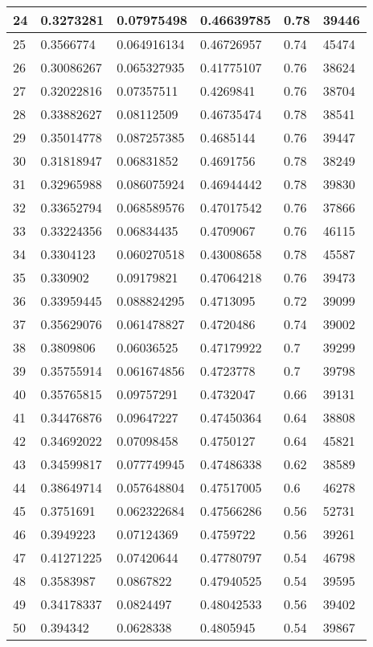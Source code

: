 \begin{longtable}{|l|l|l|l|l|l|}
24 & 0.3273281 & 0.07975498 & 0.46639785 & 0.78 & 39446 \\ \hline 
25 & 0.3566774 & 0.064916134 & 0.46726957 & 0.74 & 45474 \\ \hline 
26 & 0.30086267 & 0.065327935 & 0.41775107 & 0.76 & 38624 \\ \hline 
27 & 0.32022816 & 0.07357511 & 0.4269841 & 0.76 & 38704 \\ \hline 
28 & 0.33882627 & 0.08112509 & 0.46735474 & 0.78 & 38541 \\ \hline 
29 & 0.35014778 & 0.087257385 & 0.4685144 & 0.76 & 39447 \\ \hline 
30 & 0.31818947 & 0.06831852 & 0.4691756 & 0.78 & 38249 \\ \hline 
31 & 0.32965988 & 0.086075924 & 0.46944442 & 0.78 & 39830 \\ \hline 
32 & 0.33652794 & 0.068589576 & 0.47017542 & 0.76 & 37866 \\ \hline 
33 & 0.33224356 & 0.06834435 & 0.4709067 & 0.76 & 46115 \\ \hline 
34 & 0.3304123 & 0.060270518 & 0.43008658 & 0.78 & 45587 \\ \hline 
35 & 0.330902 & 0.09179821 & 0.47064218 & 0.76 & 39473 \\ \hline 
36 & 0.33959445 & 0.088824295 & 0.4713095 & 0.72 & 39099 \\ \hline 
37 & 0.35629076 & 0.061478827 & 0.4720486 & 0.74 & 39002 \\ \hline 
38 & 0.3809806 & 0.06036525 & 0.47179922 & 0.7 & 39299 \\ \hline 
39 & 0.35755914 & 0.061674856 & 0.4723778 & 0.7 & 39798 \\ \hline 
40 & 0.35765815 & 0.09757291 & 0.4732047 & 0.66 & 39131 \\ \hline 
41 & 0.34476876 & 0.09647227 & 0.47450364 & 0.64 & 38808 \\ \hline 
42 & 0.34692022 & 0.07098458 & 0.4750127 & 0.64 & 45821 \\ \hline 
43 & 0.34599817 & 0.077749945 & 0.47486338 & 0.62 & 38589 \\ \hline 
44 & 0.38649714 & 0.057648804 & 0.47517005 & 0.6 & 46278 \\ \hline 
45 & 0.3751691 & 0.062322684 & 0.47566286 & 0.56 & 52731 \\ \hline 
46 & 0.3949223 & 0.07124369 & 0.4759722 & 0.56 & 39261 \\ \hline 
47 & 0.41271225 & 0.07420644 & 0.47780797 & 0.54 & 46798 \\ \hline 
48 & 0.3583987 & 0.0867822 & 0.47940525 & 0.54 & 39595 \\ \hline 
49 & 0.34178337 & 0.0824497 & 0.48042533 & 0.56 & 39402 \\ \hline 
50 & 0.394342 & 0.0628338 & 0.4805945 & 0.54 & 39867 \\ \hline 
\end{longtable}